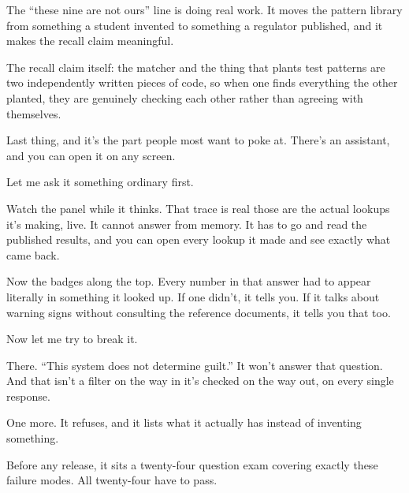 \documentclass[11pt]{article}
\begin{document}
\begin{means}
The ``these nine are not ours'' line is doing real work. It moves the pattern
library from something a student invented to something a regulator published,
and it makes the recall claim meaningful.

The recall claim itself: the matcher and the thing that plants test patterns
are two independently written pieces of code, so when one finds everything the
other planted, they are genuinely checking each other rather than agreeing with
themselves.
\end{means}


\begin{saythis}
Last thing, and it's the part people most want to poke at. There's an
assistant, and you can open it on any screen.

Let me ask it something ordinary first. 

Watch the panel while it thinks. That trace is real \bt those are the actual
lookups it's making, live. It cannot answer from memory. It has to go and read
the published results, and you can open every lookup it made and see exactly
what came back.

Now the badges along the top. Every number in that answer had to appear
literally in something it looked up. If one didn't, it tells you. If it talks
about warning signs without consulting the reference documents, it tells you
that too.

Now let me try to break it. 

There. ``This system does not determine guilt.'' It won't answer that question.
And that isn't a filter on the way in \bt it's checked on the way out, on every
single response.

One more.  It refuses, and it lists
what it actually has instead of inventing something.

Before any release, it sits a twenty-four question exam covering exactly these
failure modes. All twenty-four have to pass.
\end{saythis}
\end{document}

